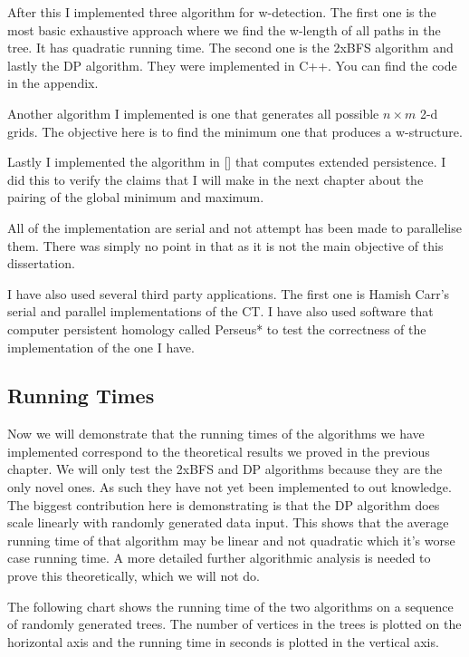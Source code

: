 After this I implemented three algorithm for w-detection. The first one is the most basic exhaustive approach where we find the w-length of all paths in the tree. It has quadratic running time. The second one is the 2xBFS algorithm and lastly the DP algorithm. They were implemented in C++. You can find the code in the appendix.

Another algorithm I implemented is one that generates all possible $n \times m$ 2-d grids. The objective here is to find the minimum one that produces a w-structure.

Lastly I implemented the algorithm in [] that computes extended persistence. I did this to verify the claims that I will make in the next chapter about the pairing of the global minimum and maximum.

All of the implementation are serial and not attempt has been made to parallelise them. There was simply no point in that as it is not the main objective of this dissertation.

I have also used several third party applications. The first one is Hamish Carr's serial and parallel implementations of the CT. I have also used software that computer persistent homology called Perseus* to test the correctness of the implementation of the one I have.


\subsection{Running Times}


Now we will demonstrate that the running times of the algorithms we have implemented correspond to the theoretical results we proved in the previous chapter. We will only test the 2xBFS and DP algorithms because they are the only novel ones. As such they have not yet been implemented to out knowledge. The biggest contribution here is demonstrating is that the DP algorithm does scale linearly with randomly generated data input. This shows that the average running time of that algorithm may be linear and not quadratic which it's worse case running time. A more detailed further algorithmic analysis is needed to prove this theoretically, which we will not do.

The following chart shows the running time of the two algorithms on a sequence of randomly generated trees. The number of vertices in the trees is plotted on the horizontal axis and the running time in seconds is plotted in the vertical axis.

